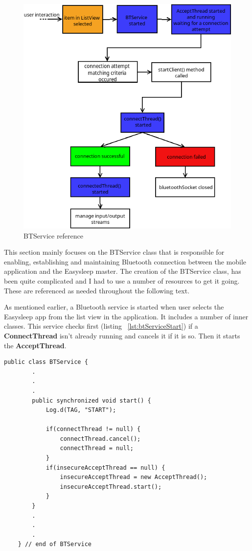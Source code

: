 \documentclass[12pt,a4paper]{article}
\begin{document}
   \begin{figure}[h]
    \centering
    \includegraphics[width=\textwidth]{btService_reference}
    \caption{BTService reference}
    \label{fig:btServiceReference}
   \end{figure}

   This section mainly focuses on the BTService class that is responsible for enabling, establishing and maintaining Bluetooth connection between the mobile application and the Easysleep master. The creation of the BTService class, has been quite complicated and I had to use a number of resources to get it going. These are referenced as needed throughout the following text.
   
   As mentioned earlier, a Bluetooth service is started when user selects the Easysleep app from the list view in the application. It includes a number of inner classes. This service checks first (listing ~\ref{lst:btServiceStart}) if a {\bfseries ConnectThread} isn't already running and cancels it if it is so. Then it starts the {\bfseries AcceptThread}.
   
   \begin{lstlisting}[label={lst:btServiceStart}, caption=BTService start()]
   public class BTService {
        .
        .
        .   
        public synchronized void start() {
            Log.d(TAG, "START");

            if(connectThread != null) {
                connectThread.cancel();
                connectThread = null;
            }
            if(insecureAcceptThread == null) {
                insecureAcceptThread = new AcceptThread();
                insecureAcceptThread.start();
            }
        }
        .
        .
        .
    } // end of BTService
    \end{lstlisting}
    
\end{document}
